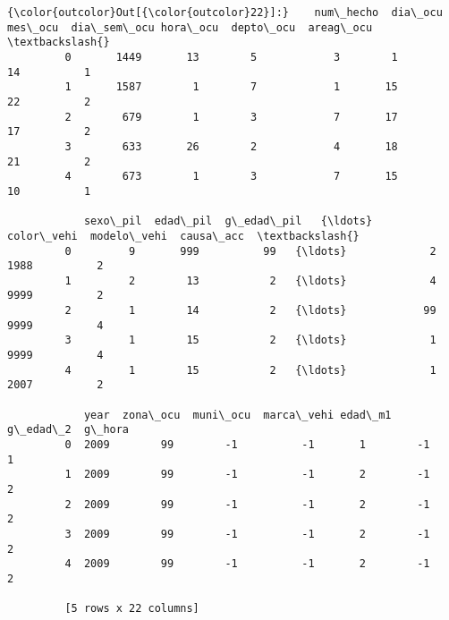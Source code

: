\documentclass[11pt]{article}
\begin{document}
\begin{Verbatim}[commandchars=\\\{\}]
{\color{outcolor}Out[{\color{outcolor}22}]:}    num\_hecho  dia\_ocu  mes\_ocu  dia\_sem\_ocu hora\_ocu  depto\_ocu  areag\_ocu  \textbackslash{}
         0       1449       13        5            3        1         14          1   
         1       1587        1        7            1       15         22          2   
         2        679        1        3            7       17         17          2   
         3        633       26        2            4       18         21          2   
         4        673        1        3            7       15         10          1   
         
            sexo\_pil  edad\_pil  g\_edad\_pil   {\ldots}    color\_vehi  modelo\_vehi  causa\_acc  \textbackslash{}
         0         9       999          99   {\ldots}             2         1988          2   
         1         2        13           2   {\ldots}             4         9999          2   
         2         1        14           2   {\ldots}            99         9999          4   
         3         1        15           2   {\ldots}             1         9999          4   
         4         1        15           2   {\ldots}             1         2007          2   
         
            year  zona\_ocu  muni\_ocu  marca\_vehi edad\_m1  g\_edad\_2  g\_hora  
         0  2009        99        -1          -1       1        -1       1  
         1  2009        99        -1          -1       2        -1       2  
         2  2009        99        -1          -1       2        -1       2  
         3  2009        99        -1          -1       2        -1       2  
         4  2009        99        -1          -1       2        -1       2  
         
         [5 rows x 22 columns]
\end{Verbatim}
            

    
    
    
    
\end{document}
